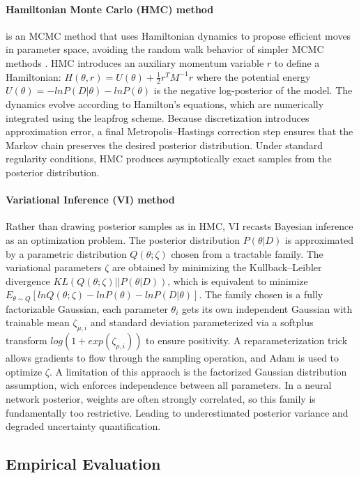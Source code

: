 \documentclass{article}
\begin{document}
\paragraph{Hamiltonian Monte Carlo (HMC) method} is an MCMC method that uses Hamiltonian dynamics to propose efficient moves in parameter space, avoiding the random walk behavior of simpler MCMC methods \cite{Brooks_2011}. HMC introduces an auxiliary momentum variable $r$ to define a Hamiltonian: $H(\theta, r) = U(\theta) + \frac{1}{2} r^T M^{-1} r$ where the potential energy $U(\theta) = - ln P(D|\theta) - ln P(\theta)$  is the negative log-posterior of the model. The dynamics evolve according to Hamilton’s equations, which are numerically integrated using the leapfrog scheme. Because discretization introduces approximation error, a final Metropolis–Hastings correction step ensures that the Markov chain preserves the desired posterior distribution. Under standard regularity conditions, HMC produces asymptotically exact samples from the posterior distribution.


\paragraph{Variational Inference (VI) method} Rather than drawing posterior samples as in HMC, VI recasts Bayesian inference as an optimization problem. The posterior distribution $P(\theta |D)$ is approximated by a parametric distribution $Q(\theta ; \zeta)$ chosen from a tractable family. The variational parameters 
$\zeta$ are obtained by minimizing the Kullback–Leibler divergence 
$KL(Q(\theta;\zeta) || P(\theta|D))$, which is equivalent to minimize 
$E_{\theta \sim Q} [ln Q(\theta ; \zeta) - ln P(\theta) - ln P(D| \theta)]$. 
The family chosen is a fully factorizable Gaussian, each parameter $\theta_i$ gets its own independent Gaussian with trainable mean $\zeta_{\mu,i}$ and standard deviation parameterized via a softplus transform $log(1 + exp( \zeta_{\rho,i}))$ to ensure positivity. A reparameterization trick allows gradients to flow through the sampling operation, and Adam is used to optimize $\zeta$.
A limitation of this appraoch is the factorized Gaussian distribution assumption, wich enforces independence between all parameters. In a neural network posterior, weights are often strongly correlated, so this family is fundamentally too restrictive. Leading to underestimated posterior variance and degraded uncertainty quantification.

\subsection{Empirical Evaluation}
\end{document}
